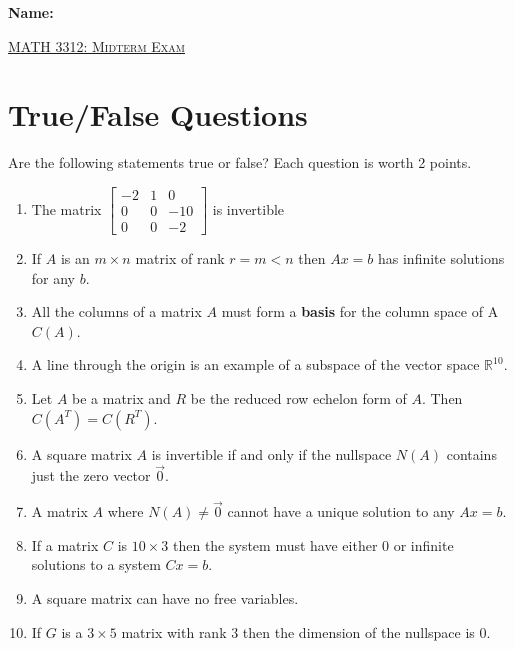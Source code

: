 \documentclass[12pt, a4paper]{article}
\theoremstyle{break}
\begin{document}
\begin{flushleft}
\Large \textbf{Name: } \underline{\hspace{8cm}} \\
\end{flushleft}
\vspace{0.25in}
\begin{center}
{\Large \textsc{\underline{MATH 3312: Midterm Exam}}}
\vspace{0.125in}
\end{center}
\section{True/False Questions}
Are the following statements true or false? Each question is worth 2 points. 
\begin{enumerate}
\item \underline{\hspace{1cm}} The matrix $
\begin{bmatrix}
-2 & 1 & 0 \\
0 &0 &-10 \\
0 & 0 & -2 
\end{bmatrix} $ is invertible
\item \underline{\hspace{1cm}}  If $A$ is an $m\times n$ matrix of rank $r=m<n$ then $Ax=b$ has infinite solutions for any $b$. 
\item \underline{\hspace{1cm}} All the columns of a matrix $A$ must form a \textbf{basis} for the column space of A $C(A)$. 
\item \underline{\hspace{1cm}} A line through the origin is an example of a subspace of the vector space $\mathbb{R}^{10}$. 
\item \underline{\hspace{1cm}} Let $A$ be a matrix and $R$ be the reduced row echelon form of $A$. Then $C(A^T)=C(R^T)$.  
\item \underline{\hspace{1cm}} A square matrix $A$ is invertible if and only if the nullspace $N(A)$ contains just the zero vector $\vec{0}$. 
\item  \underline{\hspace{1cm}} A matrix $A$ where $N(A) \neq \vec{0}$ cannot have a unique solution to any $Ax=b$. 
\item  \underline{\hspace{1cm}} If a matrix $C$ is $10 \times 3$ then the system must have either 0 or infinite solutions to a system $Cx=b$. 
\item  \underline{\hspace{1cm}} A square matrix can have no free variables. 
\item  \underline{\hspace{1cm}} If $G$ is a $3 \times 5$ matrix with rank $3$ then the dimension of the nullspace is $0$. 
\end{enumerate}
\newpage
\end{document}

